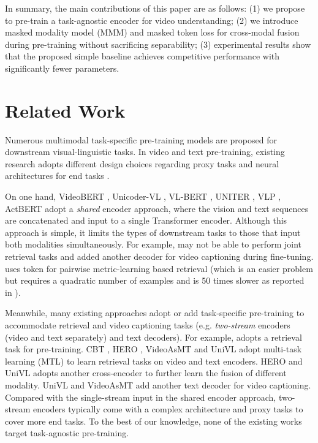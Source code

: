 \documentclass[11pt,a4paper]{article}
\begin{document}
In summary, the main contributions of this paper are as follows: (1) we propose to pre-train a task-agnostic encoder for video understanding;
(2) we introduce masked modality model (MMM) and masked token loss for cross-modal fusion during pre-training without sacrificing separability;
(3) experimental results show that the proposed simple baseline achieves competitive performance with significantly fewer parameters.

\section{Related Work}
\label{sec:related_work}




Numerous multimodal task-specific pre-training models are proposed for downstream visual-linguistic tasks.
In video and text pre-training, existing research adopts different design choices regarding proxy tasks and neural architectures for end tasks \cite{luo2020univilm}.

On one hand, 
VideoBERT \cite{sun2019videobert}, Unicoder-VL \cite{li2020unicoder}, VL-BERT \cite{Su2020VL-BERT:}, UNITER \cite{chen2020uniter}, VLP \cite{zhou2018end},
ActBERT \cite{zhu2020actbert} adopt a \textit{shared} encoder approach, where the vision and text sequences are concatenated and input to a single Transformer\cite{vaswani2017attention} encoder. Although this approach is simple, it limits the types of downstream tasks to those that input both modalities simultaneously.
For example, \cite{sun2019videobert} may not be able to perform joint retrieval tasks and added another decoder for video captioning during fine-tuning.
\cite{zhu2020actbert} uses  token for pairwise metric-learning based retrieval (which is an easier problem but requires a quadratic number of examples and is 50 times slower as reported in \cite{luo2020univilm}).

Meanwhile, many existing approaches adopt or add task-specific pre-training to accommodate retrieval and video captioning tasks (e.g. \textit{two-stream} encoders (video and text separately) and text decoders).
For example, \cite{miech2019howto100m,miech2020end,rouditchenko2020avlnet,ging2020coot,gabeur2020multi,alayrac2020self,patrick2021supportset,multiht100m_bernie} adopts a retrieval task for pre-training.
CBT \cite{sun2019contrastive}, HERO \cite{li-etal-2020-hero}, VideoAsMT \cite{korbar2020video} and UniVL \cite{luo2020univilm} adopt multi-task learning (MTL) to learn retrieval tasks on video and text encoders.
HERO \cite{li-etal-2020-hero} and UniVL \cite{luo2020univilm} adopts another cross-encoder to further learn the fusion of different modality.
UniVL \cite{luo2020univilm} and VideoAsMT \cite{korbar2020video} add another text decoder for video captioning.
Compared with the single-stream input in the shared encoder approach, two-stream encoders typically come with a complex architecture and proxy tasks to cover more end tasks.
To the best of our knowledge, none of the existing works target task-agnostic pre-training. 
\end{document}
